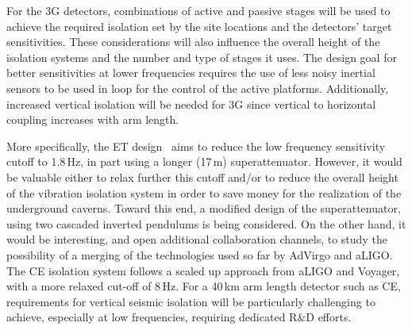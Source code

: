 
 For the 3G detectors, combinations of active and passive stages will be used to achieve the required isolation set by the site locations and the detectors' target sensitivities.
These considerations will also influence the overall height of the isolation systems and the number and type of stages it uses.
The design goal for better sensitivities at lower frequencies requires the use of less noisy inertial sensors to be used in loop for the control of the active platforms.
Additionally, increased vertical isolation will be needed for 3G since vertical to horizontal coupling increases with arm length. 

More specifically, the ET design~\cite{ET2011} aims to reduce the low frequency sensitivity cutoff to 1.8\,Hz, in part using a longer (17\,m) superattenuator. However, it would be valuable either to relax further this cutoff and/or to reduce the overall height of the vibration isolation system in order to save money for the realization of the underground caverns. Toward this end, a modified design of the superattenuator, using two cascaded inverted pendulums is being considered. On the other hand, it would be interesting, and open additional collaboration channels, to study the possibility of a merging of the technologies used so far by AdVirgo and aLIGO. 
The CE isolation system follows a scaled up approach from aLIGO and Voyager, with a more relaxed cut-off of 8\,Hz. For a 40\,km arm length detector such as CE, requirements for vertical seismic isolation will be particularly challenging to achieve, especially at low frequencies, requiring dedicated R\&D efforts.

